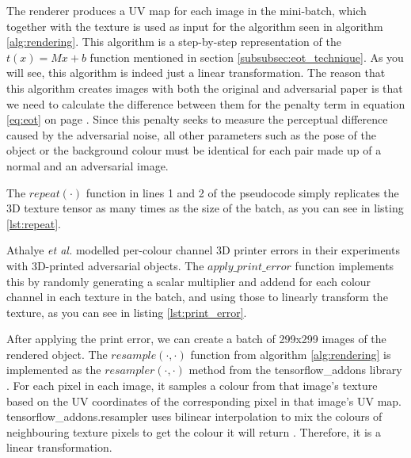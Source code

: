 The renderer produces a UV map for each image in the mini-batch, which together with the texture is used as input for the algorithm seen in algorithm \ref{alg:rendering}. This algorithm is a step-by-step representation of the $t(x) = Mx + b$ function mentioned in section \ref{subsubsec:eot_technique}. As you will see, this algorithm is indeed just a linear transformation. The reason that this algorithm creates images with both the original and adversarial paper is that we need to calculate the difference between them for the penalty term in equation \ref{eq:eot} on page \pageref{eq:eot}. Since this penalty seeks to measure the perceptual difference caused by the adversarial noise, all other parameters such as the pose of the object or the background colour must be identical for each pair made up of a normal and an adversarial image.

The $repeat(\cdot)$ function in lines 1 and 2 of the pseudocode simply replicates the 3D texture tensor as many times as the size of the batch, as you can see in listing \ref{lst:repeat}.





Athalye \textit{et al.} \cite{athalye} modelled per-colour channel 3D printer errors in their experiments with 3D-printed adversarial objects. The $apply\_print\_error$ function implements this by randomly generating a scalar multiplier and addend for each colour channel in each texture in the batch, and using those to linearly transform the texture, as you can see in listing \ref{lst:print_error}.

After applying the print error, we can create a batch of 299x299 images of the rendered object. The $resample(\cdot, \cdot)$ function from algorithm \ref{alg:rendering} is implemented as the $resampler(\cdot, \cdot)$ method from the tensorflow\_addons library \cite{tfa_resampler}. For each pixel in each image, it samples a colour from that image's texture based on the UV coordinates of the corresponding pixel in that image's UV map. tensorflow\_addons.resampler uses bilinear interpolation to mix the colours of neighbouring texture pixels to get the colour it will return \cite{tfa_resampler}. Therefore, it is a linear transformation.

